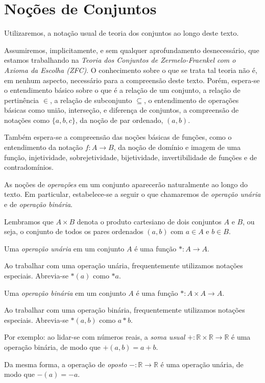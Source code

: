 \section{Noções de Conjuntos}
Utilizaremos, a notação usual de teoria dos conjuntos ao longo deste texto.

Assumiremos, implicitamente, e sem qualquer aprofundamento desnecessário, que estamos trabalhando na \emph{Teoria dos Conjuntos de Zermelo-Fraenkel com o Axioma da Escolha (ZFC)}.
O conhecimento sobre o que se trata tal teoria não é, em nenhum aspecto, necessário para a compreensão deste texto.
Porém, espera-se o entendimento básico sobre o que é a relação de um conjunto, a relação de pertinência $\in$, a relação de subconjunto $\subseteq$, o entendimento de operações básicas como união, interseção, e diferença de conjuntos, a compreensão de notações como $\{a, b, c\}$, da noção de par ordenado, $(a, b)$.

Também espera-se a compreensão das noções básicas de funções, como o entendimento da notação $f: A \to B$, da noção de domínio e imagem de uma função, injetividade, sobrejetividade, bijetividade, invertibilidade de funções e de contradomínios.

As noções de \emph{operações} em um conjunto aparecerão naturalmente ao longo do texto.
Em particular, estabelece-se a seguir o que chamaremos de \emph{operação unária} e de \emph{operação binária}.

Lembramos que $A\times B$ denota o produto cartesiano de dois conjuntos $A$ e $B$, ou seja, o conjunto de todos os pares ordenados $(a, b)$ com $a \in A$ e $b \in B$.

\begin{definition}[Operações]
    Uma \emph{operação unária} em um conjunto $A$ é uma função $*: A \to A$.

    Ao trabalhar com uma operação unária, frequentemente utilizamos notações especiais. Abrevia-se $*(a)$ como $*a$.

    Uma \emph{operação binária} em um conjunto $A$ é uma função $*: A \times A \to A$.

    Ao trabalhar com uma operação binária, frequentemente utilizamos notações especiais. Abrevia-se $*(a, b)$ como $a * b$.
\end{definition}

Por exemplo: ao lidar-se com números reais, a \emph{soma usual} $+: \mathbb{R} \times \mathbb{R} \to \mathbb{R}$ é uma operação binária, de modo que $+(a, b)=a+b$.

Da mesma forma, a operação de \emph{oposto} $-: \mathbb{R} \to \mathbb{R}$ é uma operação unária, de modo que $-(a)= -a$.





